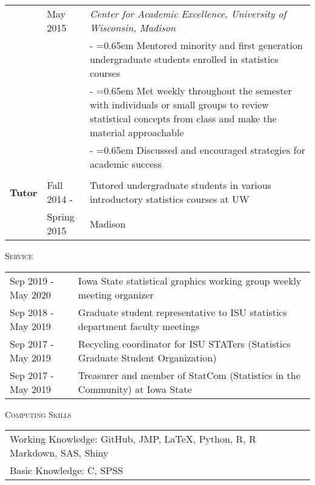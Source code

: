 \documentclass[10pt, oneside]{article}
\begin{document}
\begin{longtable}{p{1.4cm}p{2.1cm}p{13cm}}
& \hfill{May 2015} & \emph{Center for Academic Excellence, University of Wisconsin, Madison} \vspace{0.1cm}\\
& & - \hangindent=0.65em \hangafter=1 Mentored minority and first generation undergraduate students enrolled in statistics courses\\
& & - \hangindent=0.65em \hangafter=1 Met weekly throughout the semester with individuals or small groups to review statistical concepts from class and make the material approachable\\
& & - \hangindent=0.65em \hangafter=1 Discussed and encouraged strategies for academic success\\
\\
\textbf{Tutor} & \hfill{Fall 2014 -} & Tutored undergraduate students in various introductory statistics courses at UW \\
& \hfill{Spring 2015} & Madison
\end{longtable}

\noindent \textsc{Service} \hrulefill
\begin{longtable}{p{3.5cm}p{13cm}}
\hfill{Sep 2019 - May 2020} & Iowa State statistical graphics working group weekly meeting organizer\\
\hfill{Sep 2018 - May 2019} & Graduate student representative to ISU statistics department faculty meetings\\
\hfill{Sep 2017 - May 2019} & Recycling coordinator for ISU STATers (Statistics Graduate Student Organization)\\
\hfill{Sep 2017 - May 2019} & Treasurer and member of StatCom (Statistics in the Community) at Iowa State
\end{longtable}

\noindent \textsc{Computing Skills} \hrulefill
\begin{longtable}{p{16.5cm}}
Working Knowledge: GitHub, JMP, \LaTeX, Python, R, R Markdown, SAS, Shiny\\
Basic Knowledge: C, SPSS
\end{longtable}
\end{document}
